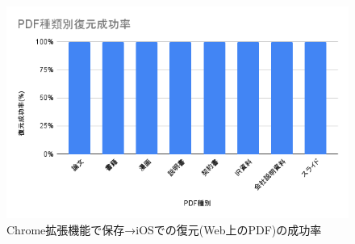 \begin{figure}[htbp]
  \caption{Chrome拡張機能で保存→iOSでの復元(Web上のPDF)の成功率}
  \label{fig:chrome-ios-local-success-rate-pdf}
  \begin{center}
    \includegraphics[bb=0 0 600 371,width=15cm]{img/060_evaluation/success-rate-pdf.pdf}
  \end{center}
\end{figure}

